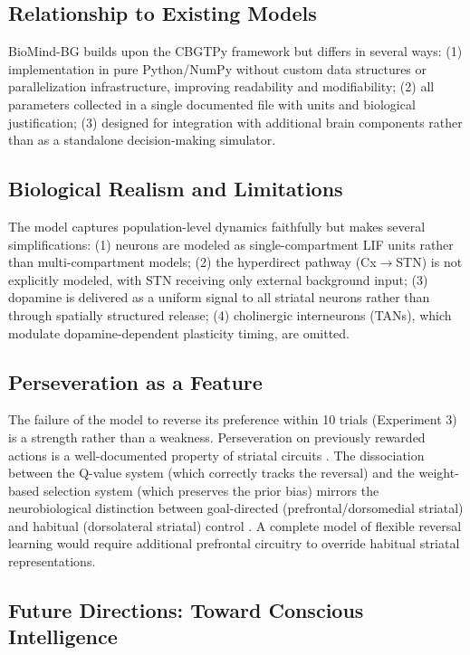 \documentclass[11pt,a4paper]{article}
\begin{document}
\subsection{Relationship to Existing Models}

BioMind-BG builds upon the CBGTPy framework \citep{dunovan2019} but differs in several ways: (1) implementation in pure Python/NumPy without custom data structures or parallelization infrastructure, improving readability and modifiability; (2) all parameters collected in a single documented file with units and biological justification; (3) designed for integration with additional brain components rather than as a standalone decision-making simulator.

\subsection{Biological Realism and Limitations}

The model captures population-level dynamics faithfully but makes several simplifications: (1) neurons are modeled as single-compartment LIF units rather than multi-compartment models; (2) the hyperdirect pathway (Cx$\rightarrow$STN) is not explicitly modeled, with STN receiving only external background input; (3) dopamine is delivered as a uniform signal to all striatal neurons rather than through spatially structured release; (4) cholinergic interneurons (TANs), which modulate dopamine-dependent plasticity timing, are omitted.

\subsection{Perseveration as a Feature}

The failure of the model to reverse its preference within 10 trials (Experiment 3) is a strength rather than a weakness. Perseveration on previously rewarded actions is a well-documented property of striatal circuits \citep{ragozzino2002}. The dissociation between the Q-value system (which correctly tracks the reversal) and the weight-based selection system (which preserves the prior bias) mirrors the neurobiological distinction between goal-directed (prefrontal/dorsomedial striatal) and habitual (dorsolateral striatal) control \citep{yin2004,daw2005}. A complete model of flexible reversal learning would require additional prefrontal circuitry to override habitual striatal representations.

\subsection{Future Directions: Toward Conscious Intelligence}
\end{document}
